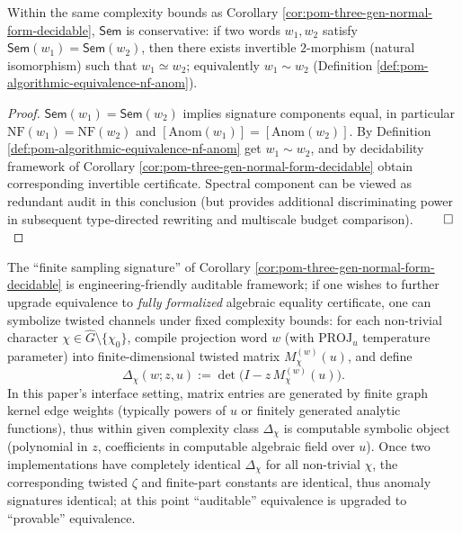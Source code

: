 \begin{theorem}\label{thm:pom-sem-conservative-on-slice}
Within the same complexity bounds as Corollary \ref{cor:pom-three-gen-normal-form-decidable}, \(\mathsf{Sem}\) is conservative: if two words \(w_1,w_2\) satisfy
\(
\mathsf{Sem}(w_1)=\mathsf{Sem}(w_2)
\),
then there exists invertible \(2\)-morphism (natural isomorphism) such that \(w_1\simeq w_2\); equivalently \(w_1\sim w_2\) (Definition \ref{def:pom-algorithmic-equivalence-nf-anom}).
\end{theorem}

\begin{proof}
\(\mathsf{Sem}(w_1)=\mathsf{Sem}(w_2)\) implies signature components equal, in particular \(\mathrm{NF}(w_1)=\mathrm{NF}(w_2)\) and \([\mathrm{Anom}(w_1)]=[\mathrm{Anom}(w_2)]\).
By Definition \ref{def:pom-algorithmic-equivalence-nf-anom} get \(w_1\sim w_2\), and by decidability framework of Corollary \ref{cor:pom-three-gen-normal-form-decidable} obtain corresponding invertible certificate.
Spectral component can be viewed as redundant audit in this conclusion (but provides additional discriminating power in subsequent type-directed rewriting and multiscale budget comparison). $\qed$
\end{proof}

\begin{remark}\label{rem:pom-anom-symbolic-certificate}
The ``finite sampling signature'' of Corollary \ref{cor:pom-three-gen-normal-form-decidable} is engineering-friendly auditable framework;
if one wishes to further upgrade equivalence to \emph{fully formalized} algebraic equality certificate, one can symbolize twisted channels under fixed complexity bounds:
for each non-trivial character \(\chi\in\widehat G\setminus\{\chi_0\}\), compile projection word \(w\) (with \(\mathrm{PROJ}_u\) temperature parameter) into finite-dimensional twisted matrix \(M_{\chi}^{(w)}(u)\), and define
\[
\Delta_\chi(w;z,u):=\det\bigl(I-z\,M_{\chi}^{(w)}(u)\bigr).
\]
In this paper's interface setting, matrix entries are generated by finite graph kernel edge weights (typically powers of \(u\) or finitely generated analytic functions), thus within given complexity class \(\Delta_\chi\) is computable symbolic object (polynomial in \(z\), coefficients in computable algebraic field over \(u\)).
Once two implementations have completely identical \(\Delta_\chi\) for all non-trivial \(\chi\), the corresponding twisted \(\zeta\) and finite-part constants are identical, thus anomaly signatures identical; at this point ``auditable'' equivalence is upgraded to ``provable'' equivalence.
\end{remark}


